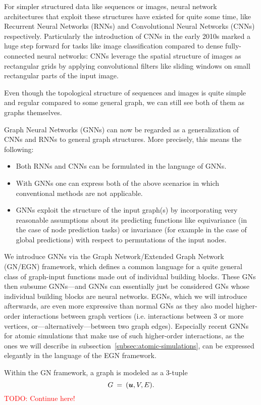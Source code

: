 For simpler structured data like sequences or images, neural
network architectures that exploit these structures have existed for quite some time, like 
Recurrent Neural Networks (RNNs) and
Convolutional Neural Networks (CNNs) respectively. Particularly the introduction of CNNs 
in the early 2010s marked a huge step forward for tasks like image classification 
compared to dense fully-connected neural networks: CNNs leverage the spatial structure of
images as rectangular grids by applying convolutional filters like sliding windows on small
rectangular parts of the input image. 

Even though the topological structure of sequences and images is quite simple and regular
compared to some general graph, we can still see both of them as graphs themselves. 



Graph Neural 
Networks (GNNs) can now be regarded as a generalization of CNNs and RNNs to general graph structures.
More precisely, this means the following:

\begin{itemize}
    \item Both RNNs and CNNs can be formulated in the language of GNNs.
    \item With GNNs one can express both of the above scenarios in which conventional
          methods are not applicable.
    \item GNNs exploit the structure of the input graph(s) by incorporating very
          reasonable assumptions about its predicting functions like equivariance
          (in the case of node prediction tasks) or invariance (for example in 
          the case of global predictions) with respect to permutations of the input
          nodes.
\end{itemize}

We introduce GNNs via the Graph Network/Extended Graph Network (GN/EGN) framework, which defines
a common language for a quite general class of graph-input functions made out of 
individual building blocks. These GNs then subsume GNNs---and GNNs can essentially just be 
considered GNs whose individual building blocks are neural networks. 
EGNs, which we will introduce afterwards, are even more expressive than normal 
GNs as they also model higher-order interactions between graph vertices (i.e. interactions 
between 3 or more vertices, or---alternatively---between two graph edges). Especially
recent GNNs for atomic simulations that make use of such higher-order interactions, as the ones 
we will describe in subsection~\ref{subsec:atomic-simulations}, can be expressed elegantly in the
language of the EGN framework.

Within the GN framework, a graph is modeled as a 3-tuple
\[ G \: = \: (\boldsymbol{u}, V, E) \text{.} \]
\textcolor{red}{TODO: Continue here!}